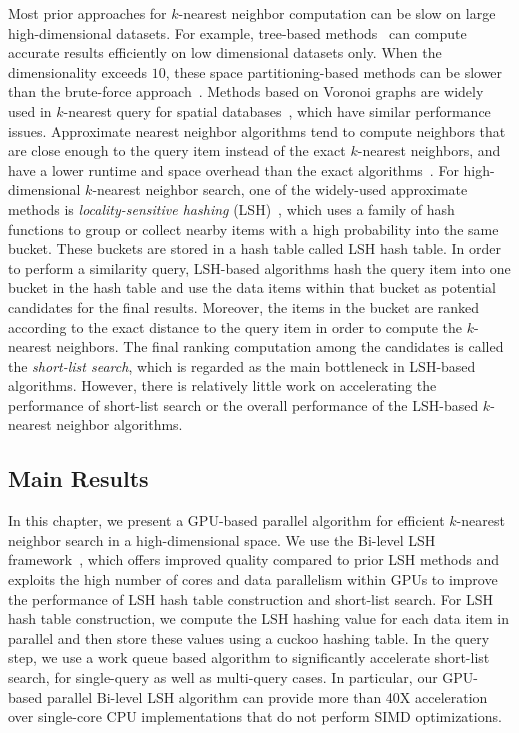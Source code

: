 Most prior approaches for $k$-nearest neighbor computation can be slow on large high-dimensional datasets. For example, tree-based methods~\cite{Samet:2005:FMM} can compute accurate results efficiently on low dimensional datasets only. When the dimensionality exceeds $10$, these space partitioning-based methods can be slower than the brute-force approach~\cite{Weber:1998:QAP}. Methods based on Voronoi graphs are widely used in $k$-nearest query for spatial databases~\cite{Kolahdouzan:2004,Hu:2010:VSQ}, which have similar performance issues. Approximate nearest neighbor algorithms tend to compute neighbors that are close enough to the query item instead of the exact $k$-nearest neighbors, and have a lower runtime and space overhead than the exact algorithms~\cite{Kleinberg:1997}. For high-dimensional $k$-nearest neighbor search, one of the widely-used approximate methods is \emph{locality-sensitive hashing} (LSH)~\cite{Datar:2004:LHS}, which uses a family of hash functions to group or collect nearby items with a high probability into the same bucket. These buckets are stored in a hash table called LSH hash table. In order to perform a similarity query, LSH-based algorithms hash the query item into one bucket in the hash table and use the data items within that bucket as potential candidates for the final results. Moreover, the items in the bucket are ranked according to the exact distance to the query item in order to compute the $k$-nearest neighbors.
The final ranking computation among the candidates is called the \emph{short-list search}, which is regarded as the main bottleneck in LSH-based algorithms. However, there is relatively little work on accelerating the performance of short-list search or the overall performance of the LSH-based $k$-nearest neighbor algorithms.

\subsection{Main Results}
In this chapter, we present a GPU-based parallel algorithm for efficient $k$-nearest neighbor search in a high-dimensional space. We use the Bi-level LSH framework~\cite{BilevelLSH2011}, which offers improved quality compared to prior LSH methods and exploits the high number of cores and data parallelism within GPUs to improve the performance of LSH hash table construction and short-list search. For LSH hash table construction, we compute the LSH hashing value for each data item in parallel and then store these values using a cuckoo hashing table. In the query step, we use a work queue based algorithm to significantly accelerate short-list search, for single-query as well as multi-query cases. In particular, our GPU-based parallel Bi-level LSH algorithm can provide more than 40X acceleration over single-core CPU implementations that do not perform SIMD optimizations.

